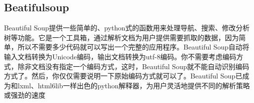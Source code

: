 \subsection{Beatifulsoup}
Beautiful Soup提供一些简单的、python式的函数用来处理导航、搜索、修改分析树等功能。它是一个工具箱，通过解析文档为用户提供需要抓取的数据，因为简单，所以不需要多少代码就可以写出一个完整的应用程序。Beautiful Soup自动将输入文档转换为Unicode编码，输出文档转换为utf-8编码。你不需要考虑编码方式，除非文档没有指定一个编码方式，这时，Beautiful Soup就不能自动识别编码方式了。然后，你仅仅需要说明一下原始编码方式就可以了。Beautiful Soup已成为和lxml、html6lib一样出色的python解释器，为用户灵活地提供不同的解析策略或强劲的速度



